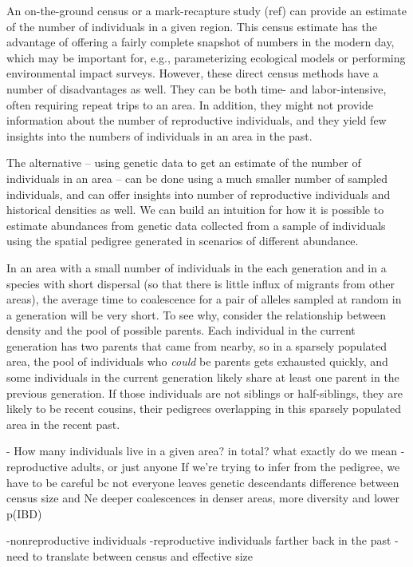 \documentclass{ar-1col}
\begin{document}
An on-the-ground census or a mark-recapture study (ref)
can provide an estimate of the number of individuals in a given region.
This census estimate has the advantage of offering a fairly complete 
snapshot of numbers in the modern day, 
which may be important for, e.g., 
parameterizing ecological models 
or performing environmental impact surveys.
However, these direct census methods have a number of disadvantages as well.
They can be both time- and labor-intensive, 
often requiring repeat trips to an area.
In addition, they might not provide information 
about the number of reproductive individuals, 
and they yield few insights into the numbers of individuals 
in an area in the past.

The alternative -- 
using genetic data to get an estimate of the number of individuals in an area -- 
can be done using a much smaller number of sampled individuals, 
and can offer insights into number of reproductive individuals and historical densities as well.
We can build an intuition for how it is possible to estimate 
abundances from genetic data collected from a sample of individuals
using the spatial pedigree generated in scenarios of different abundance.

In an area with a small number of individuals in the each generation 
and in a species with short dispersal 
(so that there is little influx of migrants from other areas), 
the average time to coalescence for a pair of alleles sampled 
at random in a generation will be very short.
To see why, consider the relationship between density 
and the pool of possible parents.
Each individual in the current generation has two parents that came from nearby,
so in a sparsely populated area, 
the pool of individuals who \emph{could} be parents gets exhausted quickly, 
and some individuals in the current generation 
likely share at least one parent in the previous generation.
If those individuals are not siblings or half-siblings,
they are likely to be recent cousins, 
their pedigrees overlapping in this sparsely populated area 
in the recent past.


        - How many individuals live in a given area? in total?
what exactly do we mean - reproductive adults, or just anyone
If we're trying to infer from the pedigree, we have to be careful bc not everyone leaves genetic descendants
difference between census size and Ne
deeper coalescences in denser areas, more diversity and lower p(IBD)

	-nonreproductive individuals
		-reproductive individuals farther back in the past
	-need to translate between census and effective size
\end{document}
